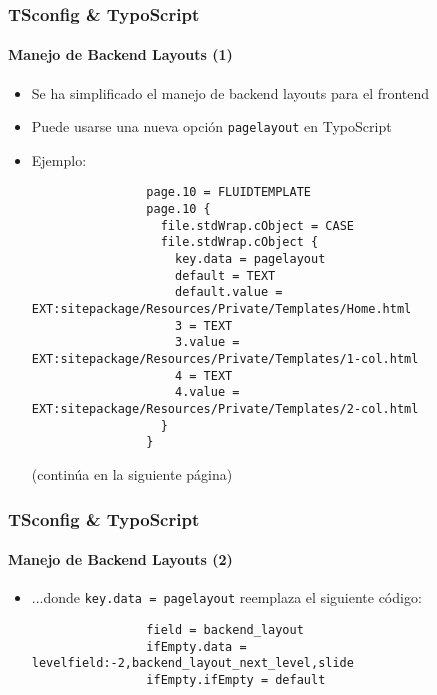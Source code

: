 \begin{frame}[fragile]
	\frametitle{TSconfig \& TypoScript}
	\framesubtitle{Manejo de Backend Layouts (1)}

	\lstset{basicstyle=\tiny\ttfamily}

	\begin{itemize}

		\item Se ha simplificado el manejo de backend layouts para el frontend

		\item Puede usarse una nueva opción \texttt{pagelayout} en TypoScript

		\item Ejemplo:

			\begin{lstlisting}
				page.10 = FLUIDTEMPLATE
				page.10 {
				  file.stdWrap.cObject = CASE
				  file.stdWrap.cObject {
				    key.data = pagelayout
				    default = TEXT
				    default.value = EXT:sitepackage/Resources/Private/Templates/Home.html
				    3 = TEXT
				    3.value = EXT:sitepackage/Resources/Private/Templates/1-col.html
				    4 = TEXT
				    4.value = EXT:sitepackage/Resources/Private/Templates/2-col.html
				  }
				}
			\end{lstlisting}

			\smaller
				(continúa en la siguiente página)
			\normalsize

	\end{itemize}

\end{frame}


\begin{frame}[fragile]
	\frametitle{TSconfig \& TypoScript}
	\framesubtitle{Manejo de Backend Layouts (2)}

	\lstset{basicstyle=\tiny\ttfamily}

	\begin{itemize}

		\item ...donde \texttt{key.data = pagelayout} reemplaza el siguiente código:

			\begin{lstlisting}
				field = backend_layout
				ifEmpty.data = levelfield:-2,backend_layout_next_level,slide
				ifEmpty.ifEmpty = default
			\end{lstlisting}

	\end{itemize}

\end{frame}

